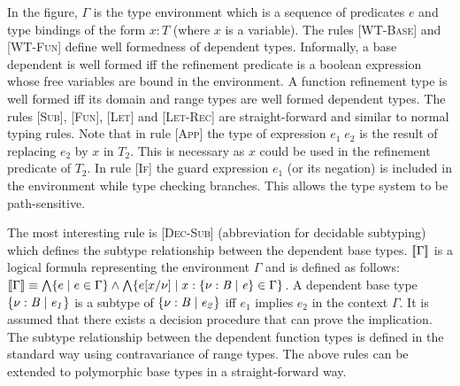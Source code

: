 %
In the figure, $\Gamma$ is the type environment which is a sequence of
predicates $e$ and type bindings of the form $x:T$ (where $x$ is a variable). 
The rules \textsc{[WT-Base]} and \textsc{[WT-Fun]} define well formedness of dependent types. Informally, a base dependent is well formed iff the refinement predicate is a boolean expression whose free variables are bound in the environment. A function refinement type is well formed iff its domain and range types are well formed dependent types. The rules \textsc{[Sub]}, \textsc{[Fun]}, \textsc{[Let]} and \textsc{[Let-Rec]} are straight-forward and similar to normal typing rules.
Note that in rule \textsc{[App]} the type of expression $e_1 \; e_2$ is the result 
of replacing $e_2$ by $x$ in $T_2$. This is necessary as $x$ could be used in the refinement predicate of $T_2$. In rule \textsc{[If]} the guard expression $e_1$ (or its negation) is included in the environment while type checking branches. This
allows the type system to be path-sensitive. 

The most interesting rule is \textsc{[Dec-Sub]} (abbreviation for decidable subtyping) which defines the subtype relationship between the dependent base types. $[\![\Gamma]\!]$ is a logical formula representing the environment $\Gamma$ and is defined as follows:
$[\![\Gamma]\!] \equiv \bigwedge \{ e \; | \; e \in \Gamma \} \wedge \bigwedge \{ e[x/\nu] \; | \; x:\mathit{\{ \nu:B \; | \; e\}} \in \Gamma \}$. 
A dependent base type $\mathit{\{ \nu:B \; | \; e_1\}}$ is a subtype of $\mathit{\{ \nu:B \; | \; e_2\}}$ iff 
$e_1$ implies $e_2$ in the context $\Gamma$. 
It is assumed that there exists a decision procedure that can prove the implication.
The subtype relationship between the dependent function types is defined in the standard way using contravariance of range types.
The above rules can be extended to polymorphic base types in a straight-forward way.

